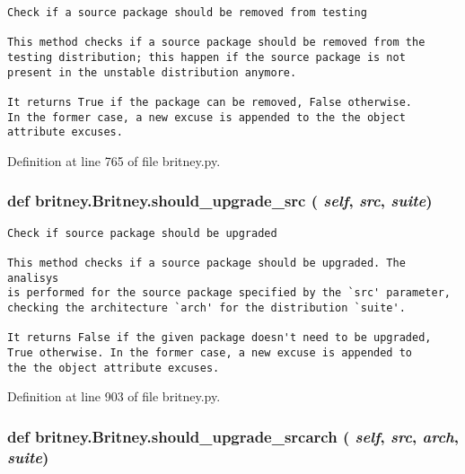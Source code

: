 \footnotesize\begin{verbatim}Check if a source package should be removed from testing

This method checks if a source package should be removed from the
testing distribution; this happen if the source package is not
present in the unstable distribution anymore.

It returns True if the package can be removed, False otherwise.
In the former case, a new excuse is appended to the the object
attribute excuses.
\end{verbatim}
\normalsize
 

Definition at line 765 of file britney.py.
\subsubsection{\setlength{\rightskip}{0pt plus 5cm}def britney.Britney.should\_\-upgrade\_\-src ( {\em self},  {\em src},  {\em suite})}\label{classbritney_1_1Britney_94785175a85f44b1afaf3add167a211f}




\footnotesize\begin{verbatim}Check if source package should be upgraded

This method checks if a source package should be upgraded. The analisys
is performed for the source package specified by the `src' parameter, 
checking the architecture `arch' for the distribution `suite'.
       
It returns False if the given package doesn't need to be upgraded,
True otherwise. In the former case, a new excuse is appended to
the the object attribute excuses.
\end{verbatim}
\normalsize
 

Definition at line 903 of file britney.py.
\subsubsection{\setlength{\rightskip}{0pt plus 5cm}def britney.Britney.should\_\-upgrade\_\-srcarch ( {\em self},  {\em src},  {\em arch},  {\em suite})}\label{classbritney_1_1Britney_bd18d7acde434387e94344a39db5b0e5}




